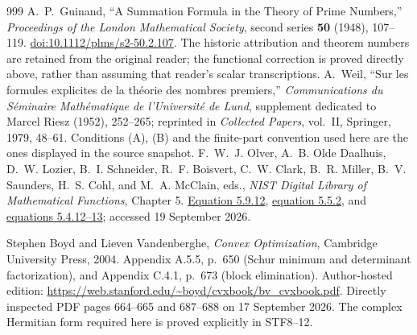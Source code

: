 \begin{thebibliography}{999}
A.~P.~Guinand, ``A Summation Formula in the Theory of Prime Numbers,''
\emph{Proceedings of the London Mathematical Society}, second series
\textbf{50} (1948), 107--119.
\href{https://doi.org/10.1112/plms/s2-50.2.107}{doi:10.1112/plms/s2-50.2.107}.
The historic attribution and theorem numbers are retained from the original
reader; the functional correction is proved directly above, rather than
assuming that reader's scalar transcriptions.
A.~Weil, ``Sur les formules explicites de la th\'eorie des nombres premiers,''
\emph{Communications du S\'eminaire Math\'ematique de l'Universit\'e de Lund},
supplement dedicated to Marcel Riesz (1952), 252--265; reprinted in
\emph{Collected Papers}, vol.~II, Springer, 1979, 48--61.
Conditions (A), (B) and the finite-part convention used here are the ones
displayed in the source snapshot.
F.~W.~J. Olver, A.~B. Olde Daalhuis, D.~W. Lozier, B.~I. Schneider,
R.~F. Boisvert, C.~W. Clark, B.~R. Miller, B.~V. Saunders, H.~S. Cohl,
and M.~A. McClain, eds., \emph{NIST Digital Library of Mathematical
Functions}, Chapter 5.
\href{https://dlmf.nist.gov/5.9.E12}{Equation 5.9.12},
\href{https://dlmf.nist.gov/5.5.E2}{equation 5.5.2}, and
\href{https://dlmf.nist.gov/5.4}{equations 5.4.12--13};
accessed 19 September 2026.

Stephen Boyd and Lieven Vandenberghe,
\emph{Convex Optimization}, Cambridge University Press, 2004.
Appendix A.5.5, p.~650 (Schur minimum and determinant factorization),
and Appendix C.4.1, p.~673 (block elimination).
Author-hosted edition: \url{https://web.stanford.edu/~boyd/cvxbook/bv_cvxbook.pdf}.
Directly inspected PDF pages 664--665 and 687--688 on 17 September 2026.
The complex Hermitian form required here is proved explicitly in STF8--12.



\end{thebibliography}
